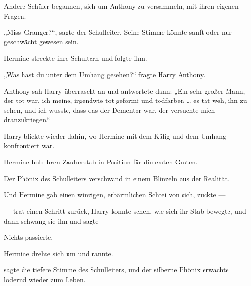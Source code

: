 Andere Schüler begannen, sich um Anthony zu versammeln, mit ihren eigenen Fragen.

„Miss~Granger?“, sagte der Schulleiter. Seine Stimme könnte sanft oder nur geschwächt gewesen sein.

Hermine streckte ihre Schultern und folgte ihm.

„Was hast du unter dem Umhang gesehen?“ fragte Harry Anthony.

Anthony sah Harry überrascht an und antwortete dann:
„Ein sehr großer Mann, der tot war, ich meine, irgendwie tot geformt und todfarben … es tat weh, ihn zu sehen, und ich wusste, dass das der Dementor war, der versuchte mich dranzukriegen.“

Harry blickte wieder dahin, wo Hermine mit dem Käfig und dem Umhang konfrontiert war.

Hermine hob ihren Zauberstab in Position für die ersten Gesten.

Der Phönix des Schulleiters verschwand in einem Blinzeln aus der Realität.

Und Hermine gab einen winzigen, erbärmlichen Schrei von sich, zuckte —

— trat einen Schritt zurück, Harry konnte sehen, wie sich ihr Stab bewegte, und dann schwang sie ihn und sagte 

Nichts passierte.

Hermine drehte sich um und rannte.

 sagte die tiefere Stimme des Schulleiters, und der silberne Phönix erwachte lodernd wieder zum Leben.

